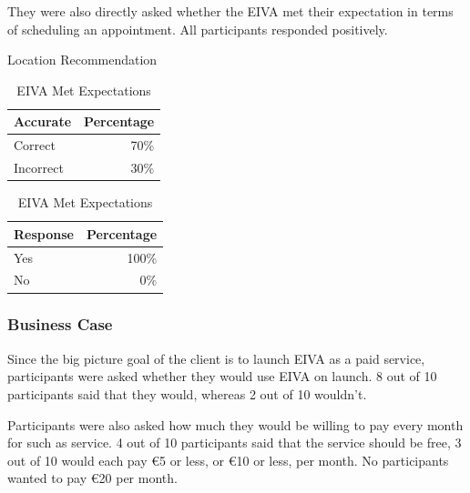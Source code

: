 \documentclass{article}
\begin{document}
They were also directly asked whether the EIVA met their expectation in terms of scheduling an appointment. All participants responded positively.

\begin{table}[!htb]
    \begin{minipage}{.5\linewidth}
   	 \caption{Location Recommendation}
      \centering
        \begin{tabular}{lr}
	        \hline
            \textbf{Accurate} & \textbf{Percentage} \\
            \hline
            Correct & 70\% \\
            Incorrect & 30\% \\
            \hline
        \end{tabular}
    \end{minipage}%
    \hspace{.1cm}
    \begin{minipage}{.5\linewidth}
      \centering
	    \caption{EIVA Met Expectations}
        \begin{tabular}{lr}
	        \hline
            \textbf{Response} & \textbf{Percentage} \\
            \hline
            Yes & 100\% \\
            No & 0\% \\
            \hline
        \end{tabular}
    \end{minipage} 
\end{table}

\subsubsection{Business Case}

Since the big picture goal of the client is to launch EIVA as a paid service, participants were asked whether they would use EIVA on launch. 8 out of 10 participants said that they would, whereas 2 out of 10 wouldn't.

Participants were also asked how much they would be willing to pay every month for such as service. 4 out of 10 participants said that the service should be free, 3 out of 10 would each pay €5 or less, or €10 or less, per month. No participants wanted to pay €20 per month.
\end{document}
